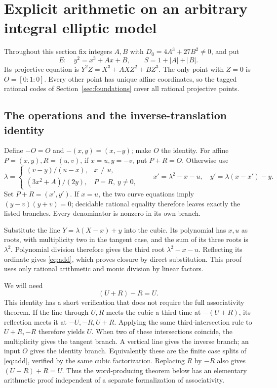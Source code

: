 \section{Explicit arithmetic on an arbitrary integral elliptic model}
\label{sec:elliptic}

Throughout this section fix integers $A,B$ with
$D_0=4A^3+27B^2\ne0$, and put
\[
 E:\quad y^2=x^3+Ax+B,\qquad S=1+|A|+|B|.
 \tag{4.1}\label{eq:4-model}
\]
Its projective equation is $Y^2Z=X^3+AXZ^2+BZ^3$.
The only point with $Z=0$ is $O=[0:1:0]$. Every other point has unique
affine coordinates, so the tagged rational codes of
Section~\ref{sec:foundations} cover all rational projective points.

\subsection{The operations and the inverse-translation identity}

Define $-O=O$ and $-(x,y)=(x,-y)$; make $O$ the identity.
For affine $P=(x,y),R=(u,v)$, if $x=u,y=-v$, put $P+R=O$.
Otherwise use
\[
 \lambda=
 \begin{cases}
  (v-y)/(u-x),&x\ne u,\\
  (3x^2+A)/(2y),&P=R,\ y\ne0,
 \end{cases}\qquad
 x'=\lambda^2-x-u,\quad y'=\lambda(x-x')-y.
 \tag{4.2}\label{eq:add}
\]
Set $P+R=(x',y')$. If $x=u$, the two curve equations imply
$(y-v)(y+v)=0$; decidable rational equality therefore leaves exactly the
listed branches. Every denominator is nonzero in its own branch.

Substitute the line $Y=\lambda(X-x)+y$ into the cubic. Its polynomial
has $x,u$ as roots, with multiplicity two in the tangent case, and the
sum of its three roots is $\lambda^2$. Polynomial division therefore
gives the third root $\lambda^2-x-u$. Reflecting its ordinate gives
\eqref{eq:add}, which proves closure by direct substitution. This proof
uses only rational arithmetic and monic division by linear factors.

We will need
\[
 (U+R)-R=U.
 \tag{4.3}\label{eq:inverse-translation}
\]
This identity has a short verification that does not require the full
associativity theorem. If the line through $U,R$ meets the cubic a third
time at $-(U+R)$, its reflection meets it at $-U,-R,U+R$.
Applying the same third-intersection rule to $U+R,-R$ therefore yields
$U$. When two of these intersections coincide, the multiplicity gives
the tangent branch. A vertical line gives the inverse branch; an input
$O$ gives the identity branch. Equivalently these are the finite case
splits of \eqref{eq:add}, verified by the same cubic factorization.
Replacing $R$ by $-R$ also gives $(U-R)+R=U$.
Thus the word-producing theorem below has an elementary arithmetic
proof independent of a separate formalization of associativity.

